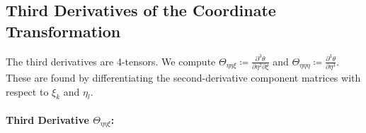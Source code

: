\documentclass{article}
\begin{document}
\subsection{Third Derivatives of the Coordinate Transformation}

The third derivatives are 4-tensors.
We compute $\Theta_{\eta\eta\xi} \coloneqq \frac{\partial^3 \theta}{\partial \eta^2 \partial \xi}$ and $\Theta_{\eta\eta\eta} \coloneqq \frac{\partial^3 \theta}{\partial \eta^3}$.
These are found by differentiating the second-derivative component matrices with respect to $\xi_k$ and $\eta_l$.

\paragraph{Third Derivative $\Theta_{\eta\eta\xi}$:}
\end{document}

